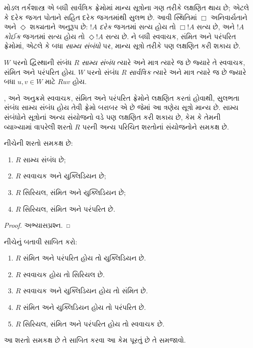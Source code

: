 
\label{guunit:OLP-0425}


મોડલ તર્કશાસ્ત્ર  એ બધી સાર્વત્રિક ફ્રેમોમાં
માન્ય સૂત્રોના ગણ તરીકે લક્ષણિત થાય છે;
એટલે કે દરેક જગત પોતાને સહિત દરેક જગતમાંથી
સુલભ છે. આવી સ્થિતિમાં $\Box$ અનિવાર્યતાને
અને $\Diamond$ શક્યતાને અનુરૂપ છે: $!A$ \emph{દરેક}
જગતમાં સત્ય હોય તો $\Box !A$ સત્ય છે, અને $!A$
\emph{કોઈક} જગતમાં સત્ય હોય તો $\Diamond !A$
સત્ય છે. ને બધી સ્વવાચક, સંમિત અને
પરંપરિત ફ્રેમોમાં, એટલે કે બધા \emph{સામ્ય સંબંધો}
પર, માન્ય સૂત્રો તરીકે પણ લક્ષણિત કરી શકાય છે.

\begin{defn}
  $W$ પરનો દ્વિસ્થાની સંબંધ $R$ \emph{સામ્ય સંબંધ}
  ત્યારે અને માત્ર ત્યારે જ છે જ્યારે તે સ્વવાચક,
  સંમિત અને પરંપરિત હોય. $W$ પરનો સંબંધ $R$
  \emph{સાર્વત્રિક} ત્યારે અને માત્ર ત્યારે જ છે જ્યારે
  બધા $u,v \in
  W$ માટે $Ruv$ હોય.
\end{defn}

,  અને  અનુક્રમે સ્વવાચક,
સંમિત અને પરંપરિત ફ્રેમોને લક્ષણિત કરતાં હોવાથી,
સુલભતા સંબંધ સામ્ય સંબંધ હોય તેવી ફ્રેમો બરાબર
એ છે જેમાં આ ત્રણેય સૂત્રો માન્ય છે.
સામ્ય સંબંધોને સૂત્રોનાં અન્ય સંયોજનો વડે
પણ લક્ષણિત કરી શકાય છે, કેમ કે તેમની વ્યાખ્યામાં
વાપરેલી શરતો $R$ પરની અન્ય પરિચિત શરતોનાં
સંયોજનોને સમકક્ષ છે.

\begin{prop}
  નીચેની શરતો સમકક્ષ છે:
  \begin{enumerate}
  \item $R$ સામ્ય સંબંધ છે;
  \item $R$ સ્વવાચક અને યુક્લિડિયન છે;
  \item $R$ સિરિયલ, સંમિત અને યુક્લિડિયન છે;
  \item $R$ સિરિયલ, સંમિત અને પરંપરિત છે.
  \end{enumerate}
\end{prop}

\begin{proof}
  અભ્યાસપ્રશ્ન.
\end{proof}

\begin{prob}
  નીચેનું બતાવી 
  સાબિત કરો:
  \begin{enumerate}
  \item $R$ સંમિત અને પરંપરિત હોય તો યુક્લિડિયન છે.
  \item $R$ સ્વવાચક હોય તો સિરિયલ છે.
  \item $R$ સ્વવાચક અને યુક્લિડિયન હોય તો સંમિત છે.
  \item $R$ સંમિત અને યુક્લિડિયન હોય તો પરંપરિત છે.
  \item $R$ સિરિયલ, સંમિત અને પરંપરિત હોય તો સ્વવાચક છે.
  \end{enumerate}
  આ શરતો સમકક્ષ છે તે સાબિત કરવા આ કેમ પૂરતું છે
  તે સમજાવો.
\end{prob}

